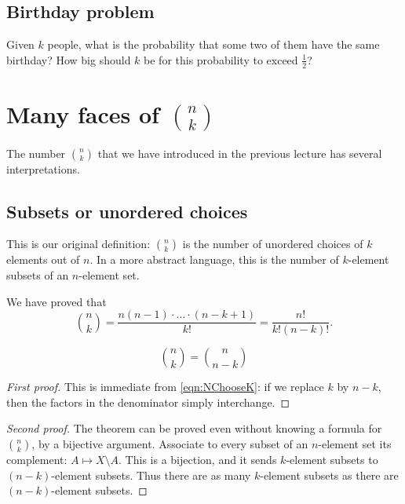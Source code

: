\begin{page}

\subsection{Birthday problem}
Given $k$ people, what is the probability that some two of them have the same birthday?
How big should $k$ be for this probability to exceed $\frac12$?










\section{Many faces of $\binom{n}{k}$}
The number $\binom{n}{k}$ that we have introduced in the previous lecture has several interpretations.
\subsection{Subsets or unordered choices}
This is our original definition: $\binom{n}{k}$ is the number of unordered choices of $k$ elements out of $n$.
In a more abstract language, this is the number of $k$-element subsets of an $n$-element set.

We have proved that
\begin{equation}
\label{eqn:NChooseK}
\binom{n}{k} = \frac{n(n-1)\cdot \ldots \cdot (n-k+1)}{k!} = \frac{n!}{k!(n-k)!}.
\end{equation}


\end{page}

\begin{page}

\begin{thm}
\[
\binom{n}{k} = \binom{n}{n-k}
\]
\end{thm}

\end{page}

\begin{page}

\begin{proof}[First proof]
This is immediate from \eqref{eqn:NChooseK}: if we replace $k$ by $n-k$, then the factors in the denominator simply interchange.
\end{proof}
\begin{proof}[Second proof]
The theorem can be proved even without knowing a formula for $\binom{n}{k}$, by a bijective argument.
Associate to every subset of an $n$-element set its complement: $A \mapsto X \setminus A$.
This is a bijection, and it sends $k$-element subsets to $(n-k)$-element subsets.
Thus there are as many $k$-element subsets as there are $(n-k)$-element subsets.
\end{proof}


\end{page}

